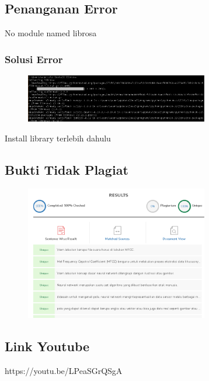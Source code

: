 \subsection{Penanganan Error}
No module named librosa
\subsubsection{Solusi Error}
\begin{figure}[H]
		\includegraphics[width=8cm]{figures/1174079/6/error.PNG}
		\centering
	\end{figure}
Install library terlebih dahulu
\subsection{Bukti Tidak Plagiat}
\begin{figure}[H]
	\includegraphics[width=8cm]{figures/1174079/6/plagiat.PNG}
	\centering
\end{figure}
\subsection{Link Youtube}
https://youtu.be/LPeaSGrQSgA